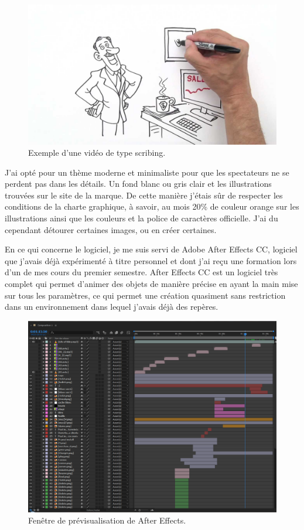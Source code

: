 \begin{figure}[htp]
  \centering
  \includegraphics[width=15cm]{images/scribe}
  \caption{Exemple d'une vidéo de type scribing.}
  \label{scribe}
\end{figure}

J'ai opté pour un thème moderne et minimaliste pour que les spectateurs ne se perdent pas dans les détails. Un fond blanc ou gris clair et les illustrations trouvées sur le site de la marque. De cette manière j'étais sûr de respecter les conditions de la charte graphique, à savoir, au mois 20\% de couleur orange sur les illustrations ainsi que les couleurs et la police de caractères officielle. J'ai du cependant détourer certaines images, ou en créer certaines.

En ce qui concerne le logiciel, je me suis servi de Adobe After Effects CC, logiciel que j'avais déjà expérimenté à titre personnel et dont j'ai reçu une formation lors d'un de mes cours du premier semestre. After Effects CC est un logiciel très complet qui permet d'animer des objets de manière précise en ayant la main mise sur tous les paramètres, ce qui permet une création quasiment sans restriction dans un environnement dans lequel j'avais déjà des repères.


\begin{figure}[htp]
  \centering
  \includegraphics[width=15cm]{images/comp1.png}
  \caption{Fenêtre de prévisualisation de After Effects.}
  \label{ae1}
\end{figure}





